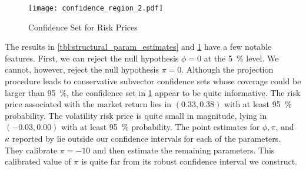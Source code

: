 \begin{figure}[htb]
	
	\centering
	\caption{Confidence Set for Risk Prices}
	\label{fig:confidence_region}
	
	\texttt{[image: confidence\_region\_2.pdf]}
\end{figure}


The results in \cref{tbl:structural_param_estimates} and \cref{fig:confidence_region} have a few notable features. First, we can reject the null hypothesis $\phi = 0$ at the \SI{5}{\percent} level. We cannot, however, reject the null hypothesis $\pi = 0$. Although the projection procedure leads to conservative subvector confidence sets whose coverage could be larger than \SI{95}{\percent}, the confidence set in \cref{fig:confidence_region} appear to be quite informative. The risk price associated with the market return lies in $(0.33, 0.38)$ with at least \SI{95}{\percent} probability. The volatility risk price is quite small in magnitude, lying in $(-0.03, 0.00)$ with at least \SI{95}{\percent} probability. The point estimates for $\phi, \pi$, and $\kappa$ reported by \textcite{han2018leverage} lie outside our confidence intervals for each of the parameters. They calibrate $\pi = -10$ and then estimate the remaining parameters. This calibrated value of $\pi$ is quite far from its robust confidence interval we construct.




